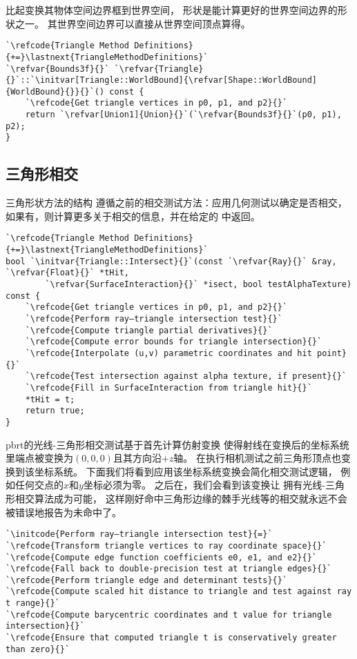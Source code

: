 比起变换其物体空间边界框到世界空间，
形状是能计算更好的世界空间边界的形状之一。
其世界空间边界可以直接从世界空间顶点算得。
\begin{lstlisting}
`\refcode{Triangle Method Definitions}{+=}\lastnext{TriangleMethodDefinitions}`
`\refvar{Bounds3f}{}` `\refvar{Triangle}{}`::`\initvar[Triangle::WorldBound]{\refvar[Shape::WorldBound]{WorldBound}{}}{}`() const {
    `\refcode{Get triangle vertices in p0, p1, and p2}{}`
    return `\refvar[Union1]{Union}{}`(`\refvar{Bounds3f}{}`(p0, p1), p2); 
}
\end{lstlisting}

\subsection{三角形相交}\label{sub:三角形相交}
三角形状方法的结构
遵循之前的相交测试方法：应用几何测试以确定是否相交，
如果有，则计算更多关于相交的信息，并在给定的
中返回。
\begin{lstlisting}
`\refcode{Triangle Method Definitions}{+=}\lastnext{TriangleMethodDefinitions}`
bool `\initvar{Triangle::Intersect}{}`(const `\refvar{Ray}{}` &ray, `\refvar{Float}{}` *tHit,
        `\refvar{SurfaceInteraction}{}` *isect, bool testAlphaTexture) const {
    `\refcode{Get triangle vertices in p0, p1, and p2}{}`
    `\refcode{Perform ray–triangle intersection test}{}`
    `\refcode{Compute triangle partial derivatives}{}`
    `\refcode{Compute error bounds for triangle intersection}{}`
    `\refcode{Interpolate (u,v) parametric coordinates and hit point}{}`
    `\refcode{Test intersection against alpha texture, if present}{}`
    `\refcode{Fill in SurfaceInteraction from triangle hit}{}`
    *tHit = t;
    return true;
}
\end{lstlisting}

pbrt的光线-三角形相交测试基于首先计算仿射变换
使得射线在变换后的坐标系统里端点被变换为$(0,0,0)$且其方向沿$+z$轴。
在执行相机测试之前三角形顶点也变换到该坐标系统。
下面我们将看到应用该坐标系统变换会简化相交测试逻辑，
例如任何交点的$x$和$y$坐标必须为零。
之后在，我们会看到该变换让
拥有光线-三角形相交算法成为可能，
这样刚好命中三角形边缘的棘手光线等的相交就永远不会被错误地报告为未命中了。
\begin{lstlisting}
`\initcode{Perform ray–triangle intersection test}{=}`
`\refcode{Transform triangle vertices to ray coordinate space}{}`
`\refcode{Compute edge function coefficients e0, e1, and e2}{}`
`\refcode{Fall back to double-precision test at triangle edges}{}`
`\refcode{Perform triangle edge and determinant tests}{}`
`\refcode{Compute scaled hit distance to triangle and test against ray t range}{}`
`\refcode{Compute barycentric coordinates and t value for triangle intersection}{}`
`\refcode{Ensure that computed triangle t is conservatively greater than zero}{}`
\end{lstlisting}


